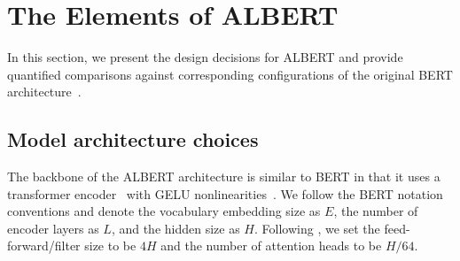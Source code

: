 \newcommand{\pdata}{p_{\rm{data}}}
\newcommand{\ptrain}{\hat{p}_{\rm{data}}}
\newcommand{\Ptrain}{\hat{P}_{\rm{data}}}
\newcommand{\pmodel}{p_{\rm{model}}}
\newcommand{\Pmodel}{P_{\rm{model}}}
\newcommand{\ptildemodel}{\tilde{p}_{\rm{model}}}
\newcommand{\pencode}{p_{\rm{encoder}}}
\newcommand{\pdecode}{p_{\rm{decoder}}}
\newcommand{\precons}{p_{\rm{reconstruct}}}

\newcommand{\laplace}{\mathrm{Laplace}} %

\newcommand{\E}{\mathbb{E}}
\newcommand{\Ls}{\mathcal{L}}
\newcommand{\R}{\mathbb{R}}
\newcommand{\emp}{\tilde{p}}
\newcommand{\lr}{\alpha}
\newcommand{\reg}{\lambda}
\newcommand{\rect}{\mathrm{rectifier}}
\newcommand{\softmax}{\mathrm{softmax}}
\newcommand{\sigmoid}{\sigma}
\newcommand{\softplus}{\zeta}
\newcommand{\KL}{D_{\mathrm{KL}}}
\newcommand{\Var}{\mathrm{Var}}
\newcommand{\standarderror}{\mathrm{SE}}
\newcommand{\Cov}{\mathrm{Cov}}
\newcommand{\normlzero}{L^0}
\newcommand{\normlone}{L^1}
\newcommand{\normltwo}{L^2}
\newcommand{\normlp}{L^p}
\newcommand{\normmax}{L^\infty}

\newcommand{\parents}{Pa} %

\DeclareMathOperator*{\argmax}{arg\,max}
\DeclareMathOperator*{\argmin}{arg\,min}

\DeclareMathOperator{\sign}{sign}
\DeclareMathOperator{\Tr}{Tr}
\let\ab\allowbreak



\section{The Elements of ALBERT}
\label{sec:model}
In this section, we present the design decisions for ALBERT and provide quantified comparisons against corresponding configurations of the original BERT architecture~\citep{devlin2018bert}.


\subsection{Model architecture choices}
The backbone of the ALBERT architecture is similar to BERT in that it uses a transformer encoder~\citep{vaswani2017attention} with GELU nonlinearities~\citep{hendrycks2016gelus}. 
We follow the BERT notation conventions and denote the vocabulary embedding size as $E$, the number of encoder layers as $L$, and the hidden size as $H$. Following \cite{devlin2018bert}, 
we set the feed-forward/filter size to be $4H$ and the number of attention heads to be $H/64$. 

